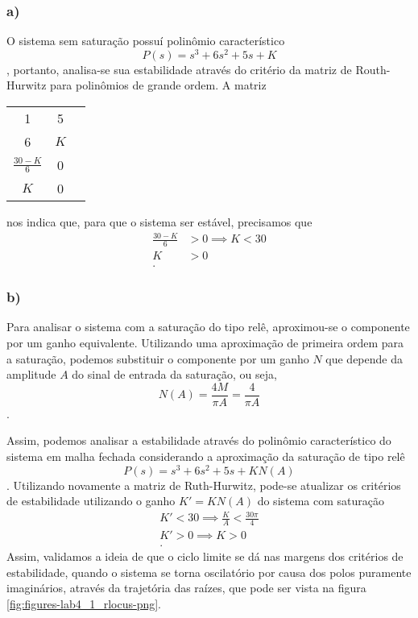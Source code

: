 \documentclass[a4paper]{report}
\begin{document}
 

\subsubsection*{a)}

O sistema sem saturação possuí polinômio característico \[
    P(s) = s^{3}+6s^2 +5s+K
\], portanto, analisa-se sua estabilidade através do critério da matriz de Routh-Hurwitz para polinômios de grande ordem. A matriz

\begin{center}
\begin{tabular}{c c c}
    1 & 5 \\
    6 & $K$ \\
    $\frac{30-K}{6}$ & 0 \\
    $K$ & 0
\end{tabular}
\end{center}

nos indica que, para que o sistema ser estável, precisamos que
\begin{align*}
    \frac{30-K}{6} &> 0 \implies K<30 \\
	         K &> 0 \\
.\end{align*}

\subsubsection*{b)}

Para analisar o sistema com a saturação do tipo relê, aproximou-se o componente por um ganho equivalente. Utilizando uma aproximação de primeira ordem para a saturação, podemos substituir o componente por um ganho $N$ que depende da amplitude $A$ do sinal de entrada da saturação, ou seja,\[
    N(A) = \frac{4M}{\pi A} = \frac{4}{\pi A}
\].

Assim, podemos analisar a estabilidade através do polinômio característico do sistema em malha fechada considerando a aproximação da saturação de tipo relê \[
    P(s) = s^{3}+6s^2 +5s+KN(A)
\]. Utilizando novamente a matriz de Ruth-Hurwitz, pode-se atualizar os critérios de estabilidade utilizando o ganho $K' = KN(A)$ do sistema com saturação
\begin{align*}
    K' < 30 \implies \frac{K}{A} < \frac{30\pi}{4}\\
    K' > 0  \implies K > 0\\
.\end{align*}
Assim, validamos a ideia de que o ciclo limite se dá nas margens dos critérios de estabilidade, quando o sistema se torna oscilatório por causa dos polos puramente imaginários, através da trajetória das raízes, que pode ser vista na figura \ref{fig:figures-lab4_1_rlocus-png}.
\end{document}
